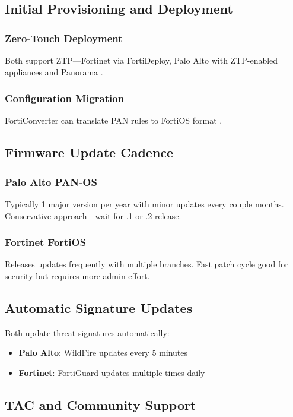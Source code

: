\documentclass[12pt]{article}
\begin{document}
\subsection{Initial Provisioning and Deployment}

\subsubsection{Zero-Touch Deployment}
Both support ZTP—Fortinet via FortiDeploy, Palo Alto with ZTP-enabled appliances and Panorama \cite{pa3400datasheet}.

\subsubsection{Configuration Migration}
FortiConverter can translate PAN rules to FortiOS format \cite{fortinetbundles2024}.

\subsection{Firmware Update Cadence}

\subsubsection{Palo Alto PAN-OS}
Typically 1 major version per year with minor updates every couple months. Conservative approach—wait for .1 or .2 release.

\subsubsection{Fortinet FortiOS}
Releases updates frequently with multiple branches. Fast patch cycle good for security but requires more admin effort.

\subsection{Automatic Signature Updates}

Both update threat signatures automatically:
\begin{itemize}
    \item \textbf{Palo Alto}: WildFire updates every 5 minutes \cite{wildfire2024}
    \item \textbf{Fortinet}: FortiGuard updates multiple times daily
\end{itemize}

\subsection{TAC and Community Support}
\end{document}
